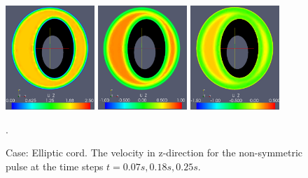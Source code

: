\begin{figure}\begin{center}
\includegraphics[width=0.3\textwidth]{chapters/hentschel/pdf/pulse_f1_08_elliptic_sysmax_nmb7.pdf}
\includegraphics[width=0.3\textwidth]{chapters/hentschel/pdf/pulse_f1_08_elliptic_sysdia_nmb18.pdf}
\includegraphics[width=0.3\textwidth]{chapters/hentschel/pdf/pulse_f1_08_elliptic_diamin1_nmb25.pdf}
\caption{Case: Elliptic cord. The velocity in z-direction for the non-symmetric pulse at the time steps $t=0.07s, 0.18s, 0.25s$.}
\label{fig:case3}.
\end{center}\end{figure}



